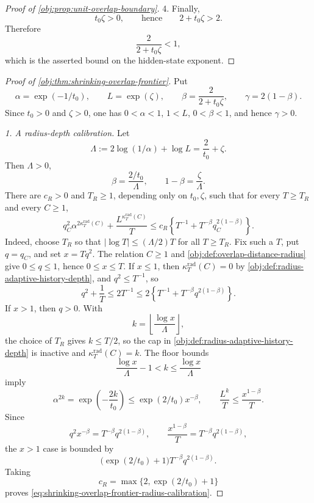 \documentclass[11pt]{article}
\begin{document}
\begin{proof}[Proof of \cref{obj:prop:unit-overlap-boundary}]
4. Finally,
\[
t_0\zeta>0,
\qquad\text{hence}\qquad
2+t_0\zeta>2.
\]
Therefore
\[
\frac{2}{2+t_0\zeta}<1,
\]
which is the asserted bound on the hidden-state exponent. %
\end{proof}

\begin{proof}[Proof of \cref{obj:thm:shrinking-overlap-frontier}]
Put
\[
\alpha=\exp(-1/t_0),\qquad L=\exp(\zeta),\qquad
\beta=\frac{2}{2+t_0\zeta},\qquad
\gamma=2(1-\beta).
\]
Since \(t_0>0\) and \(\zeta>0\), one has \(0<\alpha<1\), \(1<L\),
\(0<\beta<1\), and hence \(\gamma>0\).

\emph{1. A radius-depth calibration.}
Let
\[
\Lambda:=2\log(1/\alpha)+\log L=\frac{2}{t_0}+\zeta .
\]
Then \(\Lambda>0\),
\[
\beta=\frac{2/t_0}{\Lambda},
\qquad
1-\beta=\frac{\zeta}{\Lambda}.
\]
There are \(c_R>0\) and \(T_R\ge1\), depending only on \(t_0,\zeta\), such that for every \(T\ge T_R\) and every \(C\ge1\),
\begin{equation}\label{eq:shrinking-overlap-frontier-radius-calibration}
q_C^2\alpha^{2\kappa_T^{\mathrm{rad}}(C)}
+\frac{L^{\kappa_T^{\mathrm{rad}}(C)}}{T}
\le
c_R\left\{
T^{-1}+T^{-\beta}q_C^{2(1-\beta)}
\right\}.
\end{equation}
Indeed, choose \(T_R\) so that \(|\log T|\le(\Lambda/2)T\) for all
\(T\ge T_R\).  Fix such a \(T\), put \(q=q_C\), and set \(x=Tq^2\).
The relation \(C\ge1\) and \cref{obj:def:overlap-distance-radius} give
\(0\le q\le1\), hence \(0\le x\le T\).  If \(x\le1\), then
\(\kappa_T^{\mathrm{rad}}(C)=0\) by \cref{obj:def:radius-adaptive-history-depth}, and
\(q^2\le T^{-1}\), so
\[
q^2+\frac1T
\le 2T^{-1}
\le
2\left\{T^{-1}+T^{-\beta}q^{2(1-\beta)}\right\}.
\]
If \(x>1\), then \(q>0\).  With
\[
k=\left\lfloor\frac{\log x}{\Lambda}\right\rfloor ,
\]
the choice of \(T_R\) gives \(k\le T/2\), so the cap in
\cref{obj:def:radius-adaptive-history-depth} is inactive and
\(\kappa_T^{\mathrm{rad}}(C)=k\).  The floor bounds
\[
\frac{\log x}{\Lambda}-1<k\le\frac{\log x}{\Lambda}
\]
imply
\[
\alpha^{2k}
=\exp\!\left(-\frac{2k}{t_0}\right)
\le
\exp(2/t_0)x^{-\beta},
\qquad
\frac{L^k}{T}
\le
\frac{x^{1-\beta}}{T}.
\]
Since
\[
q^2x^{-\beta}
=
T^{-\beta}q^{2(1-\beta)},
\qquad
\frac{x^{1-\beta}}{T}
=
T^{-\beta}q^{2(1-\beta)},
\]
the \(x>1\) case is bounded by
\[
\bigl(\exp(2/t_0)+1\bigr)T^{-\beta}q^{2(1-\beta)}.
\]
Taking
\[
c_R=\max\{2,\exp(2/t_0)+1\}
\]
proves \cref{eq:shrinking-overlap-frontier-radius-calibration}. %


\end{proof}
\end{document}
